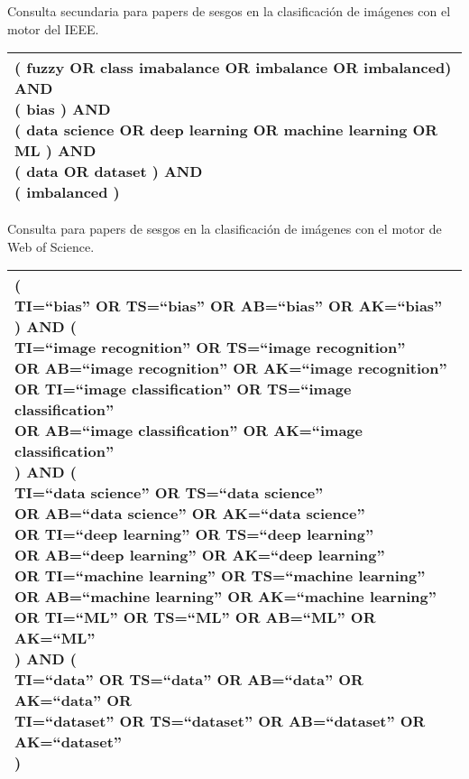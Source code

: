 \begin{table}[Consulta sesgo - IEEE 2]{}{Consulta secundaria para papers de sesgos en la clasificación de imágenes con el motor del IEEE.}
    \small
    \begin{tabular}{|l|}
    \hline
        \makecell[l]{( fuzzy OR class imabalance OR imbalance OR imbalanced) AND \\
        ( bias ) AND \\
        ( data science OR deep learning OR machine learning OR ML ) AND \\
        ( data OR dataset ) AND \\
        ( imbalanced )} \\
    \hline
    \end{tabular}
\end{table}

\begin{table}[Consulta sesgo - WoS]{}{Consulta para papers de sesgos en la clasificación de imágenes con el motor de Web of Science.}
    \small
    \begin{tabular}{|l|}
    \hline
        \makecell[l]{( \\
            TI=``bias'' OR TS=``bias'' OR AB=``bias'' OR AK=``bias'' \\
        ) AND ( \\
            TI=``image recognition'' OR TS=``image recognition'' \\
            OR AB=``image recognition'' OR AK=``image recognition'' \\
            OR TI=``image classification'' OR TS=``image classification'' \\
            OR AB=``image classification'' OR AK=``image classification'' \\
        ) AND ( \\
            TI=``data science'' OR TS=``data science'' \\
            OR AB=``data science'' OR AK=``data science'' \\
            OR TI=``deep learning'' OR TS=``deep learning'' \\
            OR AB=``deep learning'' OR AK=``deep learning'' \\
            OR TI=``machine learning'' OR TS=``machine learning'' \\
            OR AB=``machine learning'' OR AK=``machine learning'' \\
            OR TI=``ML'' OR TS=``ML'' OR AB=``ML'' OR AK=``ML'' \\
        ) AND ( \\
            TI=``data'' OR TS=``data'' OR AB=``data'' OR AK=``data'' OR \\
            TI=``dataset'' OR TS=``dataset'' OR AB=``dataset'' OR AK=``dataset'' \\
        )} \\
    \hline
    \end{tabular}
\end{table}

